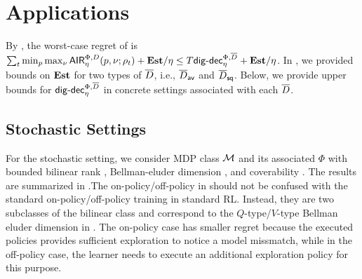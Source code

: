 
\section{Applications}\label{sec: stochastic}


By , the worst-case regret of  is $\sum_t \min_p \max_\nu \mathsf{AIR}^{\Phi, D}_\eta(p,\nu;\rho_t) + \textbf{\textup{Est}}/\eta \leq T\mathsf{dig}\text{-}\mathsf{dec}^{\Phi, \overline{D}}_\eta + \textbf{\textup{Est}}/\eta$. %
In , we provided bounds on $\textbf{\textup{Est}}$ for two types of $\overline{D}$, i.e., $\overline{D}_{\mathsf{av}}$ and $\overline{D}_{\mathsf{sq}}$. Below, we provide upper bounds for $\mathsf{dig}\text{-}\mathsf{dec}_\eta^{\Phi, \overline{D}}$ in concrete settings associated with each $\overline{D}$. 



\subsection{Stochastic Settings}
For the stochastic setting, we consider MDP class $\mathcal{M}$ and its associated $\Phi$ with bounded bilinear rank \citep{du2021bilinear}, Bellman-eluder dimension \citep{jin2021bellman}, and coverability \citep{xie2022role}. The results are summarized in .The on-policy/off-policy in  should not be confused with the standard on-policy/off-policy training in standard RL. Instead, they are two subclasses of the bilinear class \citep{du2021bilinear} and correspond to the $Q$-type/$V$-type Bellman eluder dimension in \citep{jin2021bellman}. The on-policy case has smaller regret because the executed policies provides sufficient exploration to notice a model missmatch, while in the off-policy case, the learner needs to execute an additional exploration policy for this purpose.

